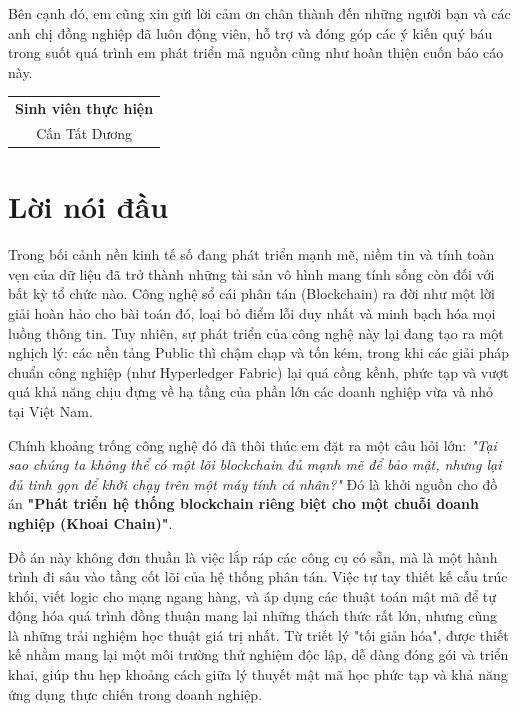 \documentclass[12pt,a4paper]{article}
\begin{document}
Bên cạnh đó, em cũng xin gửi lời cảm ơn chân thành đến những người bạn và các anh chị đồng nghiệp đã luôn động viên, hỗ trợ và đóng góp các ý kiến quý báu trong suốt quá trình em phát triển mã nguồn cũng như hoàn thiện cuốn báo cáo này.

\vspace{1cm}
\begin{flushright}
    \begin{tabular}{c}
        \textbf{Sinh viên thực hiện} \\[2cm]
        Cấn Tất Dương
    \end{tabular}
\end{flushright}

\newpage
\section*{Lời nói đầu}

Trong bối cảnh nền kinh tế số đang phát triển mạnh mẽ, niềm tin và tính toàn vẹn của dữ liệu đã trở thành những tài sản vô hình mang tính sống còn đối với bất kỳ tổ chức nào. Công nghệ sổ cái phân tán (Blockchain) ra đời như một lời giải hoàn hảo cho bài toán đó, loại bỏ điểm lỗi duy nhất và minh bạch hóa mọi luồng thông tin. Tuy nhiên, sự phát triển của công nghệ này lại đang tạo ra một nghịch lý: các nền tảng Public thì chậm chạp và tốn kém, trong khi các giải pháp chuẩn công nghiệp (như Hyperledger Fabric) lại quá cồng kềnh, phức tạp và vượt quá khả năng chịu đựng về hạ tầng của phần lớn các doanh nghiệp vừa và nhỏ tại Việt Nam. 

Chính khoảng trống công nghệ đó đã thôi thúc em đặt ra một câu hỏi lớn: \textit{"Tại sao chúng ta không thể có một lõi blockchain đủ mạnh mẽ để bảo mật, nhưng lại đủ tinh gọn để khởi chạy trên một máy tính cá nhân?"} Đó là khởi nguồn cho đồ án \textbf{"Phát triển hệ thống blockchain riêng biệt cho một chuỗi doanh nghiệp (Khoai Chain)"}.

Đồ án này không đơn thuần là việc lắp ráp các công cụ có sẵn, mà là một hành trình đi sâu vào tầng cốt lõi của hệ thống phân tán. Việc tự tay thiết kế cấu trúc khối, viết logic cho mạng ngang hàng, và áp dụng các thuật toán mật mã để tự động hóa quá trình đồng thuận mang lại những thách thức rất lớn, nhưng cũng là những trải nghiệm học thuật giá trị nhất. Từ triết lý "tối giản hóa", được thiết kế nhằm mang lại một môi trường thử nghiệm độc lập, dễ dàng đóng gói và triển khai, giúp thu hẹp khoảng cách giữa lý thuyết mật mã học phức tạp và khả năng ứng dụng thực chiến trong doanh nghiệp.
\end{document}
